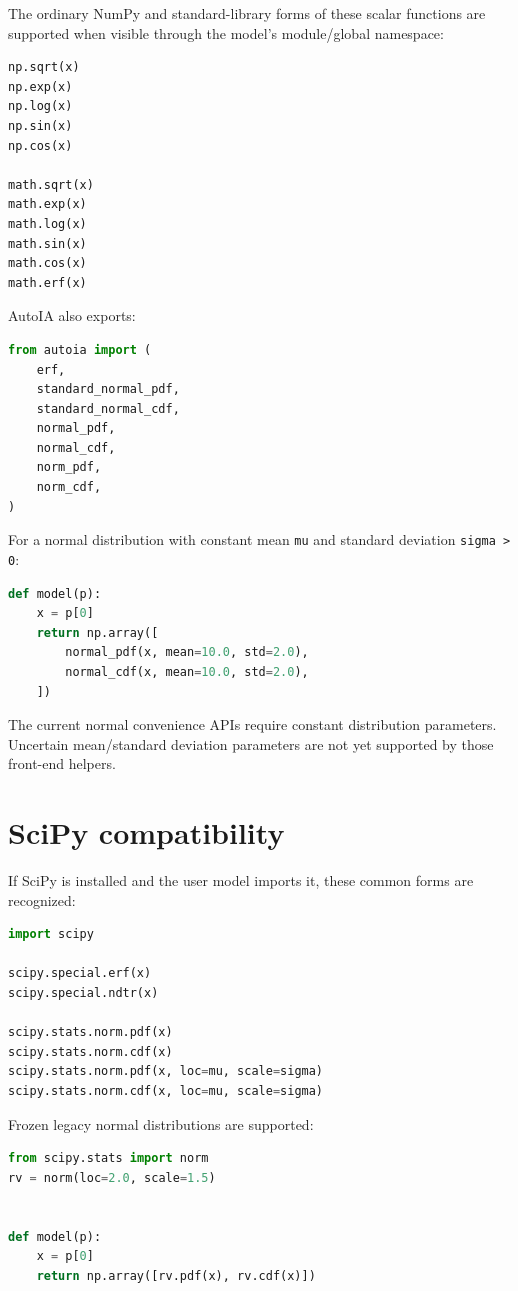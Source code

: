 \documentclass[11pt]{article}
\begin{document}
The ordinary NumPy and standard-library forms of these scalar functions are
supported when visible through the model's module/global namespace:
\begin{lstlisting}[language=Python]
np.sqrt(x)
np.exp(x)
np.log(x)
np.sin(x)
np.cos(x)

math.sqrt(x)
math.exp(x)
math.log(x)
math.sin(x)
math.cos(x)
math.erf(x)
\end{lstlisting}

AutoIA also exports:
\begin{lstlisting}[language=Python]
from autoia import (
    erf,
    standard_normal_pdf,
    standard_normal_cdf,
    normal_pdf,
    normal_cdf,
    norm_pdf,
    norm_cdf,
)
\end{lstlisting}

For a normal distribution with constant mean \texttt{mu} and standard deviation
\texttt{sigma > 0}:
\begin{lstlisting}[language=Python]
def model(p):
    x = p[0]
    return np.array([
        normal_pdf(x, mean=10.0, std=2.0),
        normal_cdf(x, mean=10.0, std=2.0),
    ])
\end{lstlisting}

The current normal convenience APIs require constant distribution parameters.
Uncertain mean/standard deviation parameters are not yet supported by those
front-end helpers.

\section{SciPy compatibility}

If SciPy is installed and the user model imports it, these common forms are
recognized:
\begin{lstlisting}[language=Python]
import scipy

scipy.special.erf(x)
scipy.special.ndtr(x)

scipy.stats.norm.pdf(x)
scipy.stats.norm.cdf(x)
scipy.stats.norm.pdf(x, loc=mu, scale=sigma)
scipy.stats.norm.cdf(x, loc=mu, scale=sigma)
\end{lstlisting}

Frozen legacy normal distributions are supported:
\begin{lstlisting}[language=Python]
from scipy.stats import norm
rv = norm(loc=2.0, scale=1.5)


def model(p):
    x = p[0]
    return np.array([rv.pdf(x), rv.cdf(x)])
\end{lstlisting}
\end{document}
